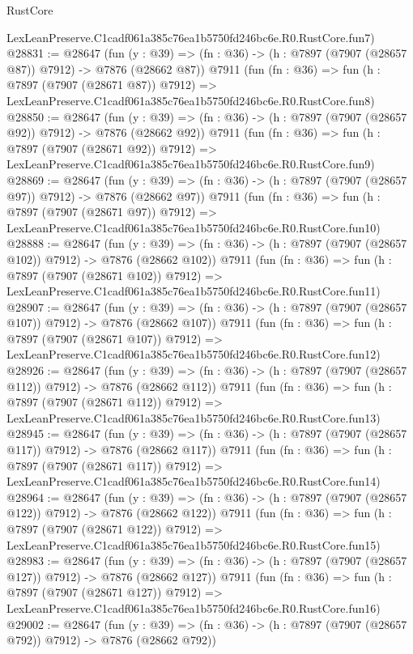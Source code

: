 \begin{lexlean}{RustCore}
\begin{coremodule}
    LexLeanPreserve.C1cadf061a385c76ea1b5750fd246bc6e.R0.RustCore.fun7)
@28831 := @28647
    (fun (y : @39) => (fn : @36) -> (h : @7897 (@7907 (@28657 @87)) @7912) -> @7876 (@28662 @87))
    @7911
    (fun (fn : @36) =>
    fun (h : @7897 (@7907 (@28671 @87)) @7912) =>
    LexLeanPreserve.C1cadf061a385c76ea1b5750fd246bc6e.R0.RustCore.fun8)
@28850 := @28647
    (fun (y : @39) => (fn : @36) -> (h : @7897 (@7907 (@28657 @92)) @7912) -> @7876 (@28662 @92))
    @7911
    (fun (fn : @36) =>
    fun (h : @7897 (@7907 (@28671 @92)) @7912) =>
    LexLeanPreserve.C1cadf061a385c76ea1b5750fd246bc6e.R0.RustCore.fun9)
@28869 := @28647
    (fun (y : @39) => (fn : @36) -> (h : @7897 (@7907 (@28657 @97)) @7912) -> @7876 (@28662 @97))
    @7911
    (fun (fn : @36) =>
    fun (h : @7897 (@7907 (@28671 @97)) @7912) =>
    LexLeanPreserve.C1cadf061a385c76ea1b5750fd246bc6e.R0.RustCore.fun10)
@28888 := @28647
    (fun (y : @39) => (fn : @36) -> (h : @7897 (@7907 (@28657 @102)) @7912) -> @7876 (@28662 @102))
    @7911
    (fun (fn : @36) =>
    fun (h : @7897 (@7907 (@28671 @102)) @7912) =>
    LexLeanPreserve.C1cadf061a385c76ea1b5750fd246bc6e.R0.RustCore.fun11)
@28907 := @28647
    (fun (y : @39) => (fn : @36) -> (h : @7897 (@7907 (@28657 @107)) @7912) -> @7876 (@28662 @107))
    @7911
    (fun (fn : @36) =>
    fun (h : @7897 (@7907 (@28671 @107)) @7912) =>
    LexLeanPreserve.C1cadf061a385c76ea1b5750fd246bc6e.R0.RustCore.fun12)
@28926 := @28647
    (fun (y : @39) => (fn : @36) -> (h : @7897 (@7907 (@28657 @112)) @7912) -> @7876 (@28662 @112))
    @7911
    (fun (fn : @36) =>
    fun (h : @7897 (@7907 (@28671 @112)) @7912) =>
    LexLeanPreserve.C1cadf061a385c76ea1b5750fd246bc6e.R0.RustCore.fun13)
@28945 := @28647
    (fun (y : @39) => (fn : @36) -> (h : @7897 (@7907 (@28657 @117)) @7912) -> @7876 (@28662 @117))
    @7911
    (fun (fn : @36) =>
    fun (h : @7897 (@7907 (@28671 @117)) @7912) =>
    LexLeanPreserve.C1cadf061a385c76ea1b5750fd246bc6e.R0.RustCore.fun14)
@28964 := @28647
    (fun (y : @39) => (fn : @36) -> (h : @7897 (@7907 (@28657 @122)) @7912) -> @7876 (@28662 @122))
    @7911
    (fun (fn : @36) =>
    fun (h : @7897 (@7907 (@28671 @122)) @7912) =>
    LexLeanPreserve.C1cadf061a385c76ea1b5750fd246bc6e.R0.RustCore.fun15)
@28983 := @28647
    (fun (y : @39) => (fn : @36) -> (h : @7897 (@7907 (@28657 @127)) @7912) -> @7876 (@28662 @127))
    @7911
    (fun (fn : @36) =>
    fun (h : @7897 (@7907 (@28671 @127)) @7912) =>
    LexLeanPreserve.C1cadf061a385c76ea1b5750fd246bc6e.R0.RustCore.fun16)
@29002 := @28647
    (fun (y : @39) => (fn : @36) -> (h : @7897 (@7907 (@28657 @792)) @7912) -> @7876 (@28662 @792))

\end{coremodule}
\end{lexlean}
